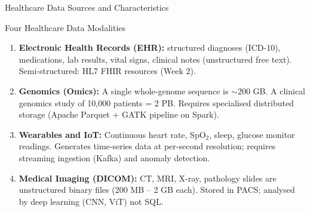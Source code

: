 \documentclass[aspectratio=169,10pt]{beamer}
\begin{document}
\begin{frame}{Healthcare Data Sources and Characteristics}
 
      \begin{block}{Four Healthcare Data Modalities}
        \begin{enumerate}
          \item \textbf{Electronic Health Records (EHR):} structured diagnoses (ICD-10), medications, lab results, vital signs, clinical notes (unstructured free text).  Semi-structured: HL7 FHIR resources (Week 2).
          \item \textbf{Genomics (Omics):}  A single whole-genome sequence is $\sim$200 GB.  A clinical genomics study of 10{,}000 patients = 2 PB.  Requires specialised distributed storage (Apache Parquet + GATK pipeline on Spark).
          \item \textbf{Wearables and IoT:}  Continuous heart rate, SpO$_2$, sleep, glucose monitor readings.  Generates time-series data at per-second resolution; requires streaming ingestion (Kafka) and anomaly detection.
          \item \textbf{Medical Imaging (DICOM):}  CT, MRI, X-ray, pathology slides are unstructured binary files (200 MB -- 2 GB each).  Stored in PACS; analysed by deep learning (CNN, ViT) not SQL.
        \end{enumerate}
      \end{block}
 
\end{frame}
\end{document}
